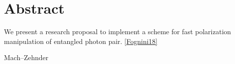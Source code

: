 \chapter*{Abstract}

We present a research proposal to implement a scheme for fast polarization manipulation of entangled photon pair.
\ref{Fognini18}


	Mach–Zehnder


